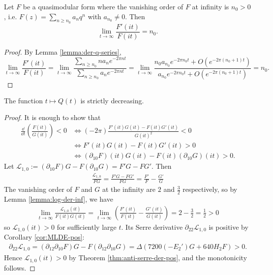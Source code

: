 \begin{lemma}\label{lemma:log-der-inf}\leanok
Let $F$ be a quasimodular form where the vanishing order of $F$ at infinity is $n_0 > 0$, i.e. $F(z) = \sum_{n \geq n_0} a_n q^{n}$ with $a_{n_0} \ne 0$. Then
\begin{equation}
    \lim_{t \to \infty} \frac{F'(it)}{F(it)} = n_0.
\end{equation}
\end{lemma}
\begin{proof}\leanok
    By Lemma \ref{lemma:der-q-series},
    \begin{equation}
        \lim_{t \to \infty} \frac{F'(it)}{F(it)} = \lim_{t \to \infty} \frac{\sum_{n \ge n_0} n a_n e^{-2 \pi n t}}{\sum_{n \ge n_0} a_n e^{-2 \pi n t}} = \lim_{t \to \infty} \frac{n_0 a_{n_0} e^{-2 \pi n_0 t} + O(e^{-2 \pi (n_0 + 1) t})}{a_{n_0} e^{-2 \pi n_0 t} + O(e^{-2 \pi (n_0 + 1) t})} = n_0.
    \end{equation}
\end{proof}

\begin{proposition}\label{prop:Qdec}\leanok
The function $t \mapsto Q(t)$ is strictly decreasing.
\end{proposition}
\begin{proof}\leanok
It is enough to show that
\begin{align}
    \frac{\dd}{\dd t} \left(\frac{F(it)}{G(it)}\right) < 0 &\Leftrightarrow (- 2\pi) \frac{F'(it)G(it) - F(it) G'(it)}{G(it)^{2}} < 0 \\
    &\Leftrightarrow F'(it) G(it) - F(it) G'(it) > 0 \\
    &\Leftrightarrow (\partial_{10}F)(it) G(it) - F(it) (\partial_{10}G)(it) > 0.
\end{align}
Let $\mathcal{L}_{1, 0} := (\partial_{10}F) G - F (\partial_{10} G) = F'G - FG'$.
Then
\begin{align}
\frac{\mathcal{L}_{1, 0}}{FG} = \frac{F'G - FG'}{FG} = \frac{F'}{F} - \frac{G'}{G}
\end{align}
The vanishing order of $F$ and $G$ at the infinity are $2$ and $\frac{3}{2}$ respectively, so by Lemma \ref{lemma:log-der-inf}, we have
\begin{align}
    \lim_{t \to \infty} \frac{\mathcal{L}_{1, 0}(it)}{F(it) G(it)} = \lim_{t \to \infty} \left(\frac{F'(it)}{F(it)} - \frac{G'(it)}{G(it)}\right) = 2 - \frac{3}{2} = \frac{1}{2} > 0
\end{align}
so $\mathcal{L}_{1, 0}(it) > 0$ for sufficiently large $t$.
Its Serre derivative $\partial_{22} \mathcal{L}_{1, 0}$ is positive by Corollary \ref{cor:MLDE-pos}:
\begin{align}
    \partial_{22} \mathcal{L}_{1, 0} = (\partial_{12} \partial_{10} F) G - F (\partial_{12}\partial_{10} G)
    = \Delta (7200 (-E_{2}') G + 640 H_2 F) > 0.
\end{align}
Hence $\mathcal{L}_{1, 0}(it) > 0$ by Theorem \ref{thm:anti-serre-der-pos}, and the monotonicity follows.
\end{proof}


